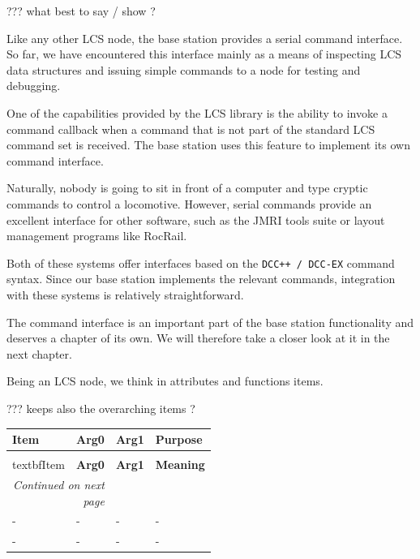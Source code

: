 ??? what best to say / show ?


Like any other LCS node, the base station provides a serial command interface. So far, we have encountered this interface mainly as a means of inspecting LCS data structures and issuing simple commands to a node for testing and debugging.

One of the capabilities provided by the LCS library is the ability to invoke a command callback when a command that is not part of the standard LCS command set is received. The base station uses this feature to implement its own command interface.

Naturally, nobody is going to sit in front of a computer and type cryptic commands to control a locomotive. However, serial commands provide an excellent interface for other software, such as the JMRI tools suite or layout management programs like RocRail.

Both of these systems offer interfaces based on the \texttt{DCC++ / DCC-EX} command syntax. Since our base station implements the relevant commands, integration with these systems is relatively straightforward.

The command interface is an important part of the base station functionality and deserves a chapter of its own. We will therefore take a closer look at it in the next chapter.



Being an LCS node, we think in attributes and functions items.

??? keeps also the overarching items ?

\begin{longtable}{@{}|l|l|l|p{0.5\linewidth}|@{}}
    \toprule
    \textbf{Item} & \textbf{Arg0} & \textbf{Arg1} & \textbf{Purpose} \\
    \midrule
    \endfirsthead
    \toprule
    \\textbf{Item} & \textbf{Arg0} & \textbf{Arg1} & \textbf{Meaning} \\
    \midrule
    \endhead
    \midrule
    \multicolumn{2}{r}{\textit{Continued on next page}} \\
    \midrule
    \endfoot
    \bottomrule
    \endlastfoot
    - & - & - & - \\
    \midrule
    - & - & - & - \\
\end{longtable}


